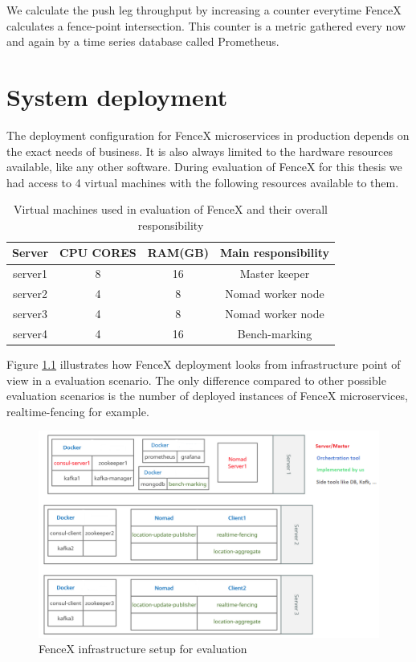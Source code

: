 \documentclass[a4]{report}
\begin{document}
    We calculate the push leg throughput by increasing a counter everytime FenceX calculates a fence-point intersection.
    This counter is a metric gathered every now and again by a time series database called Prometheus.


    \chapter{System deployment}
    The deployment configuration for FenceX microservices in production depends on the exact needs of business.
    It is also always limited to the hardware resources available, like any other software.
    During evaluation of FenceX for this thesis we had access to 4 virtual machines with the following resources
    available to them.

    \begin{table}[h!]
        \centering
        \begin{tabular}{|c|c|c|c|}
            \hline
            Server  & CPU CORES & RAM(GB) & Main responsibility \\
            \hline
            server1 & 8         & 16      & Master keeper       \\
            server2 & 4         & 8       & Nomad worker node   \\
            server3 & 4         & 8       & Nomad worker node   \\
            server4 & 4         & 16      & Bench-marking        \\
            \hline
        \end{tabular}
        \caption{Virtual machines used in evaluation of FenceX and their overall responsibility}
        \label{table:vms}
    \end{table}

    Figure \ref{fig:infrastructure} illustrates how FenceX deployment looks from infrastructure point of view in a
    evaluation scenario.
    The only difference compared to other possible evaluation scenarios is the number of deployed instances of FenceX
    microservices, realtime-fencing for example.

    \begin{figure}[h!]
        \centering
        \caption{FenceX infrastructure setup for evaluation}
        \label{fig:infrastructure}
        \includegraphics[scale=0.6]{images/Infrsutracture.png}
    \end{figure}
\end{document}
